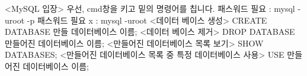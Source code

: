 <MySQL 입장>
우선, cmd창을 키고 밑의 명령어를 칩니다.
패스워드 필요 : mysql -uroot -p
패스워드 필요 x : mysql -uroot
<데이터 베이스 생성>
CREATE DATABASE 만들 데이터베이스 이름;
<데이터 베이스 제거>
DROP DATABASE 만들어진 데이터베이스 이름;
<만들어진 데이터베이스 목록 보기>
SHOW DATABASES;
<만들어진 데이터베이스 목록 중 특정 데이터베이스 사용>
USE 만들어진 데이터베이스 이름;

